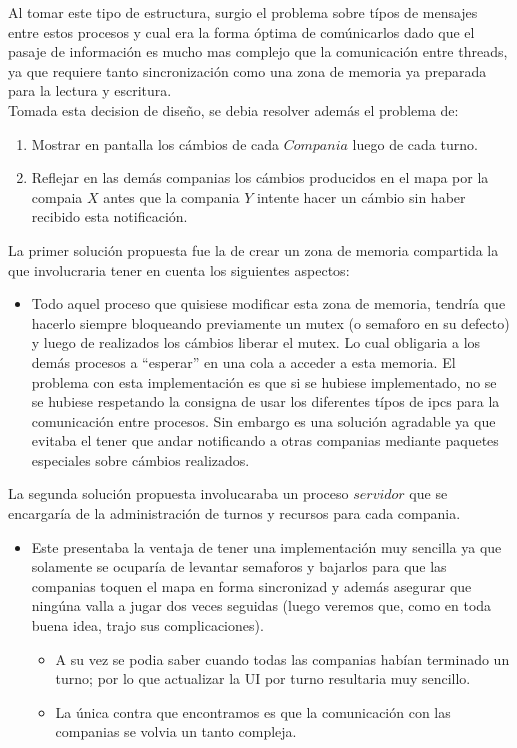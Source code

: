 \documentclass[a4paper,12pt,spanish]{article} %
\begin{document}
Al tomar este tipo de estructura, surgio el problema sobre típos de
mensajes entre estos procesos y cual era la forma óptima de comúnicarlos
dado que el pasaje de información es mucho mas complejo que la comunicación
entre threads, ya que requiere tanto sincronización como una zona
de memoria ya preparada para la lectura y escritura. \\


Tomada esta decision de diseño, se debia resolver además el problema
de:
\begin{enumerate}
\item Mostrar en pantalla los cámbios de cada $Compania$ luego de cada
turno.
\item Reflejar en las demás companias los cámbios producidos en el mapa
por la compaia $X$ antes que la compania $Y$ intente hacer un cámbio
sin haber recibido esta notificación.\\

\end{enumerate}
La primer solución propuesta fue la de crear un zona de memoria compartida
la que involucraria tener en cuenta los siguientes aspectos:
\begin{itemize}
\item Todo aquel proceso que quisiese modificar esta zona de memoria, tendría
que hacerlo siempre bloqueando previamente un mutex (o semaforo en
su defecto) y luego de realizados los cámbios liberar el mutex. Lo
cual obligaria a los demás procesos a {}``esperar'' en una cola
a acceder a esta memoria. El problema con esta implementación es que
si se hubiese implementado, no se se hubiese respetando la consigna
de usar los diferentes típos de ipcs para la comunicación entre procesos.
Sin embargo es una solución agradable ya que evitaba el tener que
andar notificando a otras companias mediante paquetes especiales sobre
cámbios realizados.
\end{itemize}
La segunda solución propuesta involucaraba un proceso $servidor$
que se encargaría de la administración de turnos y recursos para cada
compania.
\begin{itemize}
\item Este presentaba la ventaja de tener una implementación muy sencilla
ya que solamente se ocuparía de levantar semaforos y bajarlos para
que las companias toquen el mapa en forma sincronizad y además asegurar
que ningúna valla a jugar dos veces seguidas (luego veremos que, como
en toda buena idea, trajo sus complicaciones).

\begin{itemize}
\item A su vez se podia saber cuando todas las companias habían terminado
un turno; por lo que actualizar la UI por turno resultaria muy sencillo.
\item La única contra que encontramos es que la comunicación con las companias
se volvia un tanto compleja.
\end{itemize}
\end{itemize}
\end{document}
